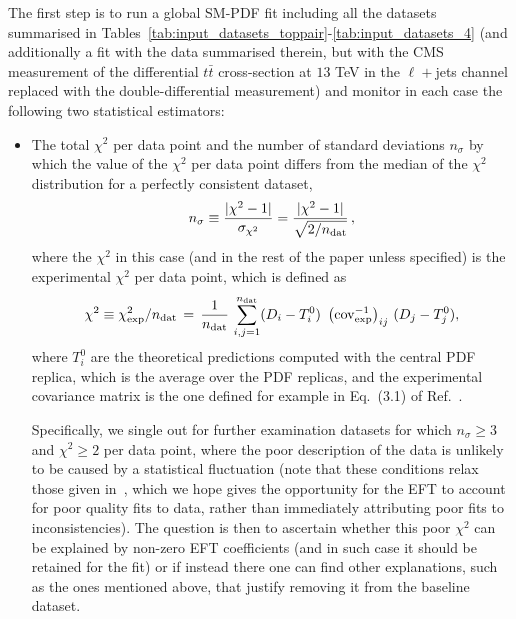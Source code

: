 \documentclass[withindex,glossary]{cam-thesis}
\begin{document}
The first step is to run a global SM-PDF fit including all the datasets
summarised in Tables~\ref{tab:input_datasets_toppair}-\ref{tab:input_datasets_4}
(and additionally a fit with the data summarised therein, but with the CMS measurement of 
the differential $t\bar{t}$ cross-section at $13$ TeV in the $\ell+$jets channel replaced with 
the double-differential measurement) and monitor in each case the following two statistical estimators:

\begin{itemize}
%
\item The total $\chi^2$ per data point and the number of standard deviations $n_\sigma$ by which the value of the
  $\chi^2$ per data point differs from the median of the $\chi^2$ distribution
  for a perfectly consistent dataset,
  \begin{equation}\label{eq:nsigma}
    n_\sigma\equiv
    \frac{|\chi^2-1|}{\sigma_{\chi^2}}=\frac{|\chi^2-1|}{\sqrt{2/n_{\rm dat}}} \, ,
  \end{equation}
  where the $\chi^2$ in this case (and in the rest of the paper unless
  specified) is the experimental $\chi^2$ per
  data point, which is defined as
  \begin{equation}\label{eq:chi2exp}
\chi^2 \equiv \chi^2_{\rm exp}/n_{\rm dat} \,=  \,\frac{1}{n_{\rm
    dat}}\,\sum_{i,j=1}^{n_{\rm dat}} (D_i-T_i^0)\,\,\left({\rm cov}_{\rm exp}^{-1}\right)_{ij}  \,(D_j-T_j^0),
  \end{equation}
  where $T_i^0$ are the theoretical predictions computed with the
  central PDF replica, which is the average over the PDF replicas, and
  the experimental covariance matrix is the one defined for example in
  Eq.~(3.1) of Ref.~\cite{Ball:2022uon}.
  
  Specifically, we single out for further examination datasets for which $n_\sigma\ge  3$
  and $\chi^2 \ge 2$ per data point, where the poor description of the data is unlikely
  to be caused by a statistical fluctuation (note that these conditions relax those given 
  in~\cite{NNPDF:2021njg}, which we hope gives the opportunity for the EFT to account for
  poor quality fits to data, rather than immediately attributing poor fits to inconsistencies).
  The question is then to ascertain whether this poor $\chi^2$ can be explained
  by non-zero EFT coefficients (and in such case it should be retained
  for the fit) or if instead there one can find other explanations,
  such as the ones mentioned above, that justify removing it from the baseline
  dataset.


\end{itemize}
\end{document}
